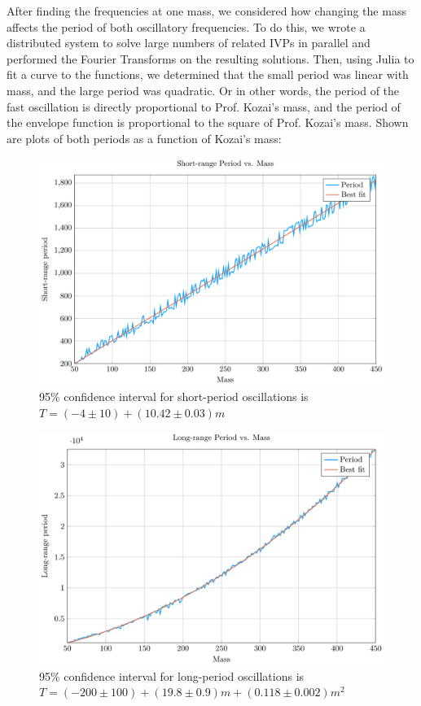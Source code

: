 \documentclass{article}
\begin{document}
\begin{multicols}{2}
  After finding the frequencies at one mass, we considered how changing the mass affects the period of both oscillatory frequencies. To do this, we wrote a distributed system to solve large numbers of related IVPs in parallel and performed the Fourier Transforms on the resulting solutions. Then, using Julia to fit a curve to the functions, we determined that the small period was linear with mass, and the large period was quadratic. Or in other words, the period of the fast oscillation is directly proportional to Prof. Kozai’s mass, and the period of the envelope function is proportional to the square of Prof. Kozai’s mass. Shown are plots of both periods as a function of Kozai's mass:
  \begin{figure}[H]
    \includegraphics[scale=0.2]{short_period}
    \caption{95\% confidence interval for short-period oscillations is $T = (-4 \pm 10) + (10.42 \pm 0.03)m$}
  \end{figure}

  \begin{figure}[H]
    \includegraphics[scale=0.2]{long_period}
    \caption{95\% confidence interval for long-period oscillations is $T = (-200 \pm 100) + (19.8 \pm 0.9)m + (0.118 \pm 0.002)m^2$}
  \end{figure}


\end{multicols}
\end{document}
